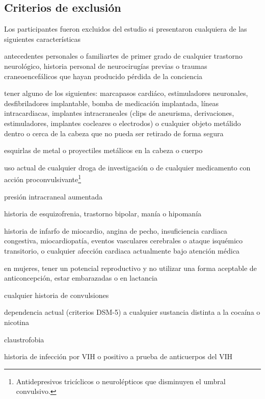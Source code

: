 \subsection{Criterios de exclusión}
Los participantes fueron excluidos del estudio si presentaron cualquiera de las siguientes características
\begin{enumerate*}[label=\emph{\alph*}), before=\unskip{: }, itemjoin={{; }}, itemjoin*={{, e }}]
    \item antecedentes personales o familiartes de primer grado de cualquier trastorno neurológico, historia personal de neurocirugías previas o traumas craneoencefálicos que hayan producido pérdida de la conciencia
    \item tener alguno de los siguientes: marcapasos cardiáco, estimuladores neuronales, desfibriladores implantable, bomba de medicación implantada, líneas intracardiacas, implantes intracraneales (clips de aneurisma, derivaciones, estimuladores, implantes cocleares o electrodos) o cualquier objeto metálido dentro o cerca de la cabeza que no pueda ser retirado de forma segura
    \item esquirlas de metal o proyectiles metálicos en la cabeza o cuerpo
    \item uso actual de cualquier droga de investigación o de cualquier medicamento con acción proconvulsivante\footnote{Antidepresivos tricíclicos o neurolépticos que disminuyen el umbral convulsivo.}
    \item presión intracraneal aumentada
    \item historia de esquizofrenia, trastorno bipolar, manía o hipomanía
    \item historia de infarfo de miocardio, angina de pecho, insuficiencia cardiaca congestiva, miocardiopatía, eventos vasculares cerebrales o ataque isquémico transitorio, o cualquier afección cardiaca actualmente bajo atención médica
    \item en mujeres, tener un potencial reproductivo y no utilizar una forma aceptable de anticoncepción, estar embarazadas o en lactancia
    \item cualquier historia de convulsiones
    \item dependencia actual (criterios DSM-5) a cualquier sustancia distinta a la cocaína o nicotina
    \item claustrofobia
    \item historia de infección por VIH o positivo a prueba de anticuerpos del VIH
\end{enumerate*}

